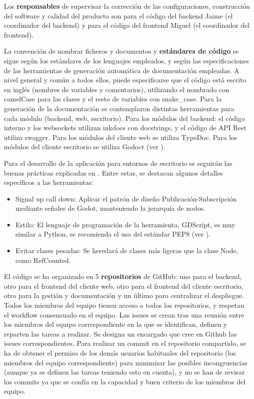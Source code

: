 \documentclass[11pt]{article}
\begin{document}
%

Los \textbf{responsables} de supervisar la corrección de las configuraciones,
construcción del software y calidad del producto son para el código del
backend Jaime (el coordinador del backend) y para el código del frontend
Miguel (el coordinador del frontend).

La convención de nombrar ficheros y documentos y 
\textbf{estándares de código} se sigue según los estándares de los lenguajes empleados,
y según las especificaciones de las herramientas de generación automática de documentación
empleadas.
A nivel general y común a todos ellos, puede especificarse que
el código está escrito en inglés (nombres de variables y comentarios),
utilizando el nombrado con camelCase para las clases y el resto de variables 
con snake\_case.
Para la generación de la documentación se contemplaron distintas herramientas 
para cada módulo (backend, web, escritorio). 
Para los módulos del backend: el código interno y los websockets utilizan
mkdocs con docstrings, y el código de API Rest utiliza swagger.
Para los módulos del cliente web se utiliza TypeDoc.
Para los módulos del cliente escritorio se utiliza Godoct (ver \cite{godoct}).

Para el desarrollo de la aplicación para entornos de escritorio se seguirán
las buenas prácticas explicadas en \cite{godot_best_practices}. Entre estas,
se destacan algunos detalles específicos a las herramientas:
\begin{itemize}
		\item Signal up call down: Aplicar el patrón de diseño Publicación-Subscripción
				mediante señales de Godot, manteniendo la jerarquía de nodos.
		\item Estilo: El lenguaje de programación de la herramienta,
				GDScript, es muy similar a Python, se recomienda el uso del
				estándar PEP8 (ver \cite{pep8}).
		\item Evitar clases pesadas: Se heredará de clases más ligeras que la
				clase Node, como RefCounted.
\end{itemize}

El código se ha organizado en 5 \textbf{repositorios} de GitHub: uno para el
backend, otro para el frontend del cliente web, otro para el frontend del
cliente escritorio, otro para la gestión y documentación y un último para
centralizar el despliegue. Todos los miembros del equipo tienen acceso a todos
los repositorios, y respetan el workflow consensuado en el equipo. Las issues
se crean tras una reunión entre los miembros del equipo correspondiente en la
que se identifican, definen y reparten las tareas a realizar. Se designa un
encargado que cree en Github las issues correspondientes. Para realizar un
commit en el repositorio compartido, se ha de obtener el permiso de los demás
usuarios habituales del repositorio (los miembros del equipo correspondiente)
para minimizar las posibles incongruencias (aunque ya se definen las tareas
teniendo esto en cuenta), y no se han de revisar los commits ya que se confía
en la capacidad y buen criterio de los miembros del equipo.
\end{document}

